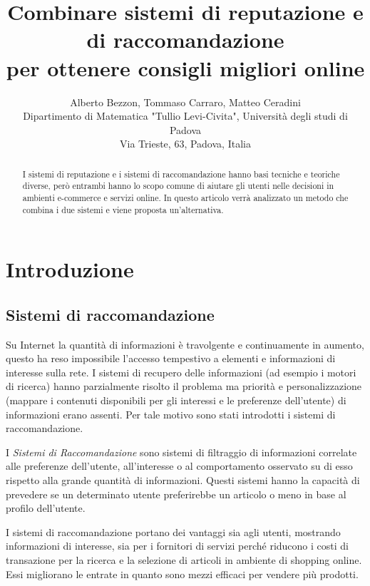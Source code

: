 \documentclass[letterpaper]{article} %
\begin{document}
%
\title{Combinare sistemi di reputazione e di raccomandazione \\per ottenere consigli migliori online}
\author{Alberto Bezzon, Tommaso Carraro, Matteo Ceradini \\
Dipartimento di Matematica "Tullio Levi-Civita", Università degli studi di Padova\\
Via Trieste, 63, Padova, Italia\\
}
\maketitle
\begin{abstract}
I sistemi di reputazione e i sistemi di raccomandazione hanno basi tecniche e teoriche diverse, però entrambi hanno lo scopo comune di aiutare gli utenti nelle decisioni in ambienti e-commerce e servizi online. In questo articolo verrà analizzato un metodo che combina i due sistemi e viene proposta un'alternativa. 
\end{abstract}

\section{Introduzione}

\subsection{Sistemi di raccomandazione}

Su Internet la quantità di informazioni è travolgente e continuamente in
aumento, questo ha reso impossibile l'accesso tempestivo a elementi e
informazioni di interesse sulla rete. I sistemi di recupero delle
informazioni (ad esempio i motori di ricerca) hanno parzialmente risolto
il problema ma priorità e personalizzazione (mappare i contenuti
disponibili per gli interessi e le preferenze dell'utente) di
informazioni erano assenti. Per tale motivo sono stati introdotti i sistemi di raccomandazione.

I \emph{Sistemi di Raccomandazione} sono sistemi di filtraggio di
informazioni correlate alle preferenze dell'utente, all'interesse o al
comportamento osservato su di esso rispetto alla grande quantità di
informazioni. Questi sistemi hanno la capacità di prevedere se un
determinato utente preferirebbe un articolo o meno in base al profilo
dell'utente.

I sistemi di raccomandazione portano dei vantaggi sia agli utenti,
mostrando informazioni di interesse, sia per i fornitori di servizi
perché riducono i costi di transazione per la ricerca e la selezione di
articoli in ambiente di shopping online. Essi migliorano le entrate in
quanto sono mezzi efficaci per vendere più prodotti.
\end{document}

